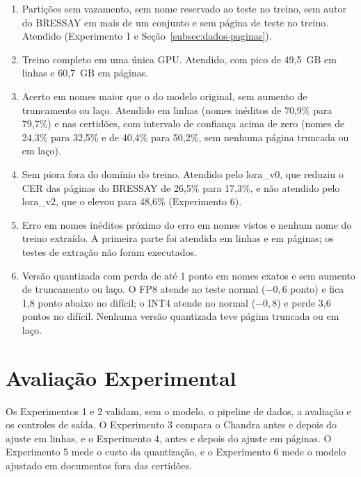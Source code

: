 \documentclass[12pt,a4paper]{article}
\begin{document}
\begin{enumerate}
    \item Partições sem vazamento, sem nome reservado ao teste no treino, sem autor do BRESSAY em mais de um conjunto e sem página de teste no treino. Atendido (Experimento 1 e Seção~\ref{subsec:dados-paginas}).
    \item Treino completo em uma única GPU. Atendido, com pico de 49,5~GB em linhas e 60,7~GB em páginas.
    \item Acerto em nomes maior que o do modelo original, sem aumento de truncamento ou laço. Atendido em linhas (nomes inéditos de 70,9\% para 79,7\%) e nas certidões, com intervalo de confiança acima de zero (nomes de 24,3\% para 32,5\% e de 40,4\% para 50,2\%, sem nenhuma página truncada ou em laço).
    \item Sem piora fora do domínio do treino. Atendido pelo lora\_v0, que reduziu o CER das páginas do BRESSAY de 26,5\% para 17,3\%, e não atendido pelo lora\_v2, que o elevou para 48,6\% (Experimento 6).
    \item Erro em nomes inéditos próximo do erro em nomes vistos e nenhum nome do treino extraído. A primeira parte foi atendida em linhas e em páginas; os testes de extração não foram executados.
    \item Versão quantizada com perda de até 1 ponto em nomes exatos e sem aumento de truncamento ou laço. O FP8 atende no teste normal ($-0{,}6$ ponto) e fica 1,8 ponto abaixo no difícil; o INT4 atende no normal ($-0{,}8$) e perde 3,6 pontos no difícil. Nenhuma versão quantizada teve página truncada ou em laço.
\end{enumerate}

\section{Avaliação Experimental}
\label{sec:avaliacao}

Os Experimentos 1 e 2 validam, sem o modelo, o pipeline de dados, a avaliação e os controles de saída. O Experimento 3 compara o Chandra antes e depois do ajuste em linhas, e o Experimento 4, antes e depois do ajuste em páginas. O Experimento 5 mede o custo da quantização, e o Experimento 6 mede o modelo ajustado em documentos fora das certidões.

\end{document}
